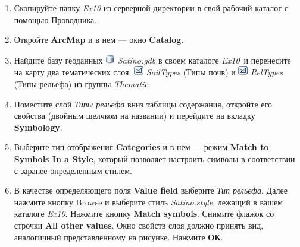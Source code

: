\documentclass[]{book}
\theoremstyle{definition}
\theoremstyle{definition}
\theoremstyle{definition}
\theoremstyle{remark}
\begin{document}
\begin{enumerate}
\def\labelenumi{\arabic{enumi}.}
\item
  Скопируйте папку \emph{Ex10} из серверной директории в свой рабочий
  каталог с помощью Проводника.
\item
  Откройте \textbf{ArcMap} и в нем --- окно \textbf{Catalog}.
\item
  Найдите базу геоданных \includegraphics{images/Ex10/image2.png}
  \emph{Satino.gdb} в своем каталоге \emph{Ex10}~и перенесите на карту
  два тематических слоя: \includegraphics{images/Ex10/image3.png}
  \emph{SoilTypes} (Типы почв) и
  \includegraphics{images/Ex10/image3.png} \emph{RelTypes} (Типы
  рельефа) из группы \emph{Thematic}.
\item
  Поместите слой \emph{Типы рельефа} вниз таблицы содержания, откройте
  его свойства (двойным щелчком на названии) и перейдите на вкладку
  \textbf{Symbology}.
\item
  Выберите тип отображения \textbf{Categories} и в нем --- режим
  \textbf{Match to Symbols In a Style}, который позволяет настроить
  символы в соответствии с заранее определенным стилем.
\item
  В качестве определяющего поля \textbf{Value field} выберите \emph{Тип
  рельефа}. Далее нажмите кнопку Browse и выберите стиль
  \emph{Satino.style}, лежащий в вашем каталоге \emph{Ex10}. Нажмите
  кнопку \textbf{Match symbols}. Снимите флажок со строчки \textbf{All
  other values}. Окно свойств слоя должно принять вид, аналогичный
  представленному на рисунке. Нажмите \textbf{ОК}.


\end{enumerate}
\end{document}
